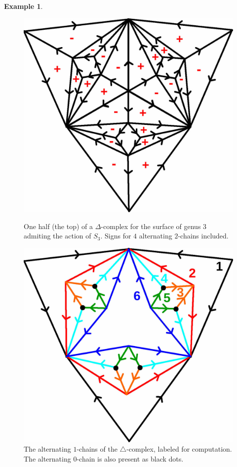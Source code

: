 \documentclass[11pt,a4paper,twoside]{article}
\theoremstyle{plain}
\theoremstyle{definition}
\theoremstyle{definition}
\theoremstyle{definition}
\theoremstyle{definition}
\newtheorem{example}[thm]{Example}
\theoremstyle{definition}
\begin{document}
\begin{example}
\begin{figure}
\begin{minipage}{.48\textwidth}
\end{minipage}%
\hfill
\begin{minipage}{.48\textwidth}
  \centering
\includegraphics[scale=0.18]{Images/Genus3ActionDeltaComplex.jpg}
\vspace{-4mm}
    \caption{One half (the top) of a $\Delta$-complex for the surface of genus $3$ admiting the action of $S_3$. Signs for $4$ alternating $2$-chains included.}
    \label{Fig:S3onGenus3DeltaComplex}
\end{minipage}


\centering
\begin{minipage}{.48\textwidth}
  \centering
\includegraphics[scale=0.18]{Images/Genus3Alt1Chains.jpg}
    \caption{The alternating $1$-chains of the $\triangle$-complex, labeled for computation. The alternating $0$-chain is also present as black dots.}
    \label{Fig:Genus3Alt1Chains}


\end{minipage}
\end{figure}
\end{example}
\end{document}
